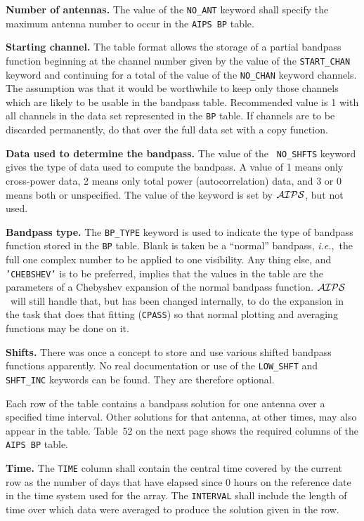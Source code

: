 \documentclass[twoside]{article}
\newcommand{\AIPS}{{$\cal AIPS\/$}}
\newcommand{\ie}{{\it i.e.},}
\begin{document}
{\bf Number of antennas.} The value of the {\tt NO\_ANT} keyword shall
specify the maximum antenna number to occur in the {\tt AIPS BP} table.

{\bf Starting channel.} The table format allows the storage of a
partial bandpass function beginning at the channel number given by the
value of the {\tt START\_CHAN} keyword and continuing for a total of
the value of the {\tt NO\_CHAN} keyword channels.  The assumption was
that it would be worthwhile to keep only those channels which are
likely to be usable in the bandpass table.  Recommended value is 1
with all channels in the data set represented in the {\tt BP} table.
If channels are to be discarded permanently, do that over the full
data set with a copy function.

{\bf Data used to determine the bandpass.} The value of the {\tt
  NO\_SHFTS} keyword gives the type of data used to compute the
bandpass.  A value of 1 means only cross-power data, 2  means only
total power (autocorrelation) data, and 3 or 0 means both or
unspecified.  The value of the keyword is set by \AIPS, but not used.

{\bf Bandpass type.} The {\tt BP\_TYPE} keyword is used to indicate
the type of bandpass function stored in the {\tt BP} table.  Blank is
taken be a ``normal'' bandpass, \ie\ the full one complex number to be
applied to one visibility.  Any thing else, and {\tt 'CHEBSHEV'} is to
be preferred, implies that the values in the table are the parameters
of a Chebyshev expansion of the normal bandpass function.  \AIPS\ will
still handle that, but has been changed internally, to do the
expansion in the task that does that fitting ({\tt CPASS}) so that
normal plotting and averaging functions may be done on it.

{\bf Shifts.} There was once a concept to store and use various
shifted bandpass functions apparently.  No real documentation or use
of the {\tt LOW\_SHFT} and {\tt SHFT\_INC} keywords can be found.
They are therefore optional.

Each row of the table contains a bandpass solution for one antenna
over a specified time interval.  Other solutions for that antenna, at
other times, may also appear in the table.  Table~52 on the next page
shows the required columns of the {\tt AIPS BP} table.

{\bf Time.}  The {\tt TIME} column shall contain the central time
covered by the current row as the number of days that have elapsed
since 0 hours on the reference date in the time system used for the
array.  The {\tt INTERVAL} shall include the length of time over which
data were averaged to produce the solution given in the row.
\end{document}
